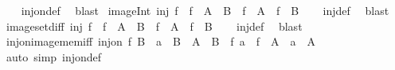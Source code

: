 \begin{isabellebody}
%
\isadelimproof
\ \ %
\endisadelimproof
%
\isatagproof
{}\isamarkupfalse%
\ inj{\isacharunderscore}{\kern0pt}on{\isacharunderscore}{\kern0pt}def\ \isamarkupfalse%
\ blast%
\endisatagproof
{\isafoldproof}%
%
\isadelimproof
\isanewline
%
\endisadelimproof
\isanewline
{}\isamarkupfalse%
\ image{\isacharunderscore}{\kern0pt}Int{\isacharcolon}{\kern0pt}\ {\isachardoublequoteopen}inj\ f\ {\isasymLongrightarrow}\ f\ {\isacharbackquote}{\kern0pt}\ {\isacharparenleft}{\kern0pt}A\ {\isasyminter}\ B{\isacharparenright}{\kern0pt}\ {\isacharequal}{\kern0pt}\ f\ {\isacharbackquote}{\kern0pt}\ A\ {\isasyminter}\ f\ {\isacharbackquote}{\kern0pt}\ B{\isachardoublequoteclose}\isanewline
%
\isadelimproof
\ \ %
\endisadelimproof
%
\isatagproof
{}\isamarkupfalse%
\ inj{\isacharunderscore}{\kern0pt}def\ \isamarkupfalse%
\ blast%
\endisatagproof
{\isafoldproof}%
%
\isadelimproof
\isanewline
%
\endisadelimproof
\isanewline
{}\isamarkupfalse%
\ image{\isacharunderscore}{\kern0pt}set{\isacharunderscore}{\kern0pt}diff{\isacharcolon}{\kern0pt}\ {\isachardoublequoteopen}inj\ f\ {\isasymLongrightarrow}\ f\ {\isacharbackquote}{\kern0pt}\ {\isacharparenleft}{\kern0pt}A\ {\isacharminus}{\kern0pt}\ B{\isacharparenright}{\kern0pt}\ {\isacharequal}{\kern0pt}\ f\ {\isacharbackquote}{\kern0pt}\ A\ {\isacharminus}{\kern0pt}\ f\ {\isacharbackquote}{\kern0pt}\ B{\isachardoublequoteclose}\isanewline
%
\isadelimproof
\ \ %
\endisadelimproof
%
\isatagproof
{}\isamarkupfalse%
\ inj{\isacharunderscore}{\kern0pt}def\ \isamarkupfalse%
\ blast%
\endisatagproof
{\isafoldproof}%
%
\isadelimproof
\isanewline
%
\endisadelimproof
\isanewline
{}\isamarkupfalse%
\ inj{\isacharunderscore}{\kern0pt}on{\isacharunderscore}{\kern0pt}image{\isacharunderscore}{\kern0pt}mem{\isacharunderscore}{\kern0pt}iff{\isacharcolon}{\kern0pt}\ {\isachardoublequoteopen}inj{\isacharunderscore}{\kern0pt}on\ f\ B\ {\isasymLongrightarrow}\ a\ {\isasymin}\ B\ {\isasymLongrightarrow}\ A\ {\isasymsubseteq}\ B\ {\isasymLongrightarrow}\ f\ a\ {\isasymin}\ f\ {\isacharbackquote}{\kern0pt}\ A\ {\isasymlongleftrightarrow}\ a\ {\isasymin}\ A{\isachardoublequoteclose}\isanewline
%
\isadelimproof
\ \ %
\endisadelimproof
%
\isatagproof
{}\isamarkupfalse%
\ {\isacharparenleft}{\kern0pt}auto\ simp{\isacharcolon}{\kern0pt}\ inj{\isacharunderscore}{\kern0pt}on{\isacharunderscore}{\kern0pt}def{\isacharparenright}{\kern0pt}%
\endisatagproof
{\isafoldproof}%
%
\isadelimproof
\isanewline
%

\end{isabellebody}
